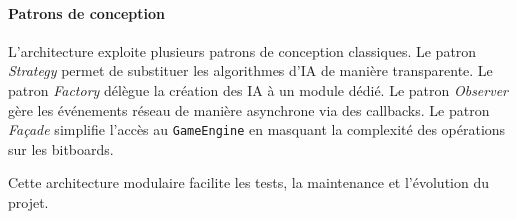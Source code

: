 \documentclass[a4paper]{article}
\begin{document}
\paragraph{Patrons de conception}

L'architecture exploite plusieurs patrons de conception classiques. Le patron \textit{Strategy} permet de substituer les algorithmes d'IA de manière transparente. Le patron \textit{Factory} délègue la création des IA à un module dédié. Le patron \textit{Observer} gère les événements réseau de manière asynchrone via des callbacks. Le patron \textit{Façade} simplifie l'accès au \texttt{GameEngine} en masquant la complexité des opérations sur les bitboards.

Cette architecture modulaire facilite les tests, la maintenance et l'évolution du projet.

\end{document}
